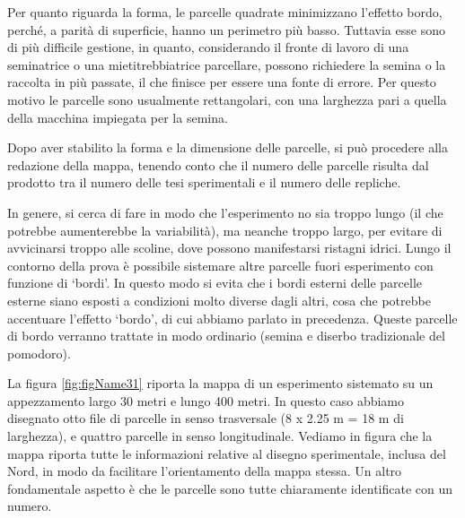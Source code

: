 \documentclass[a4paper,12pt,oneside]{book}
\theoremstyle{definition}
\theoremstyle{definition}
\theoremstyle{definition}
\theoremstyle{remark}
\begin{document}
Per quanto riguarda la forma, le parcelle quadrate minimizzano l'effetto
bordo, perché, a parità di superficie, hanno un perimetro più basso.
Tuttavia esse sono di più difficile gestione, in quanto, considerando il
fronte di lavoro di una seminatrice o una mietitrebbiatrice parcellare,
possono richiedere la semina o la raccolta in più passate, il che
finisce per essere una fonte di errore. Per questo motivo le parcelle
sono usualmente rettangolari, con una larghezza pari a quella della
macchina impiegata per la semina.

Dopo aver stabilito la forma e la dimensione delle parcelle, si può
procedere alla redazione della mappa, tenendo conto che il numero delle
parcelle risulta dal prodotto tra il numero delle tesi sperimentali e il
numero delle repliche.

In genere, si cerca di fare in modo che l'esperimento no sia troppo
lungo (il che potrebbe aumenterebbe la variabilità), ma neanche troppo
largo, per evitare di avvicinarsi troppo alle scoline, dove possono
manifestarsi ristagni idrici. Lungo il contorno della prova è possibile
sistemare altre parcelle fuori esperimento con funzione di `bordi'. In
questo modo si evita che i bordi esterni delle parcelle esterne siano
esposti a condizioni molto diverse dagli altri, cosa che potrebbe
accentuare l'effetto `bordo', di cui abbiamo parlato in precedenza.
Queste parcelle di bordo verranno trattate in modo ordinario (semina e
diserbo tradizionale del pomodoro).

La figura \ref{fig:figName31} riporta la mappa di un esperimento
sistemato su un appezzamento largo 30 metri e lungo 400 metri. In questo
caso abbiamo disegnato otto file di parcelle in senso trasversale (8 x
2.25 m = 18 m di larghezza), e quattro parcelle in senso longitudinale.
Vediamo in figura che la mappa riporta tutte le informazioni relative al
disegno sperimentale, inclusa del Nord, in modo da facilitare
l'orientamento della mappa stessa. Un altro fondamentale aspetto è che
le parcelle sono tutte chiaramente identificate con un numero.
\end{document}
